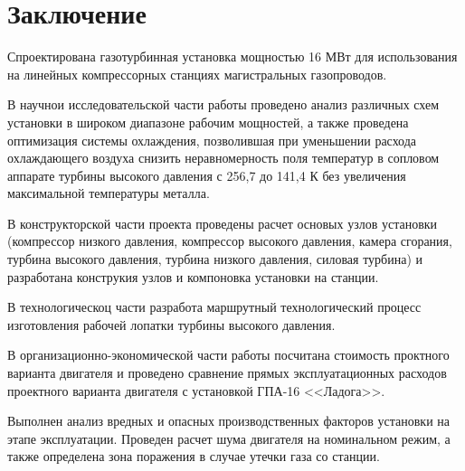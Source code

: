\section*{Заключение}

Спроектирована газотурбинная установка мощностью 16 МВт для использования на линейных
компрессорных станциях магистральных газопроводов.

В научнои исследовательской части работы проведено анализ различных схем установки в широком
диапазоне рабочим мощностей, а также проведена оптимизация системы охлаждения, позволившая при уменьшении
расхода охлаждающего воздуха снизить неравномерность поля температур в сопловом аппарате
турбины высокого давления с 256,7 до 141,4 К без увеличения максимальной температуры металла.

В конструкторской части проекта проведены расчет основых узлов установки (компрессор низкого давления, компрессор высокого давления,
камера сгорания, турбина высокого давления, турбина низкого давления, силовая турбина) и разработана
конструкия узлов и компоновка установки на станции.

В технологическоц части разработа маршрутный технологический процесс изготовления рабочей лопатки турбины высокого давления.

В организационно-экономической части работы посчитана стоимость проктного варианта двигателя и проведено сравнение прямых
эксплуатационных расходов проектного варианта двигателя с установкой ГПА-16 <<Ладога>>.

Выполнен анализ вредных и опасных производственных факторов установки на этапе эксплуатации. Проведен расчет шума двигателя на
номинальном режим, а также определена зона поражения в случае утечки газа со станции.
